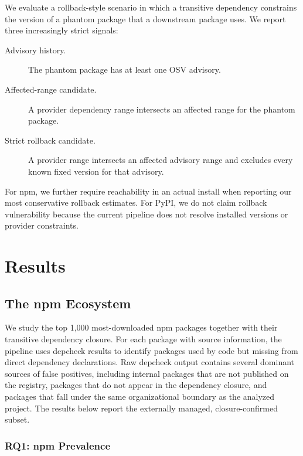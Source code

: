 \documentclass[letterpaper,twocolumn,10pt]{article}
\newcommand{\npm}{npm\xspace}
\newcommand{\pypi}{PyPI\xspace}
\begin{document}
We evaluate a rollback-style scenario in which a transitive dependency constrains
the version of a phantom package that a downstream package uses.  We report
three increasingly strict signals:
\begin{description}
  \item[Advisory history.] The phantom package has at least one OSV advisory.
  \item[Affected-range candidate.] A provider dependency range intersects an
  affected range for the phantom package.
  \item[Strict rollback candidate.] A provider range intersects an affected
  advisory range and excludes every known fixed version for that advisory.
\end{description}
For \npm, we further require reachability in an actual install when reporting
our most conservative rollback estimates.  For \pypi, we do not claim rollback
vulnerability because the current pipeline does not resolve installed versions
or provider constraints.

\section{Results}

\subsection{The npm Ecosystem}

We study the top 1,000 most-downloaded \npm packages together with their
transitive dependency closure.  For each package with source information, the
pipeline uses depcheck results to identify packages used by code but missing
from direct dependency declarations.  Raw depcheck output contains several
dominant sources of false positives, including internal packages that are not
published on the registry, packages that do not appear in the dependency
closure, and packages that fall under the same organizational boundary as the
analyzed project.  The results below report the externally managed,
closure-confirmed subset.

\subsubsection{RQ1: npm Prevalence}
\end{document}
